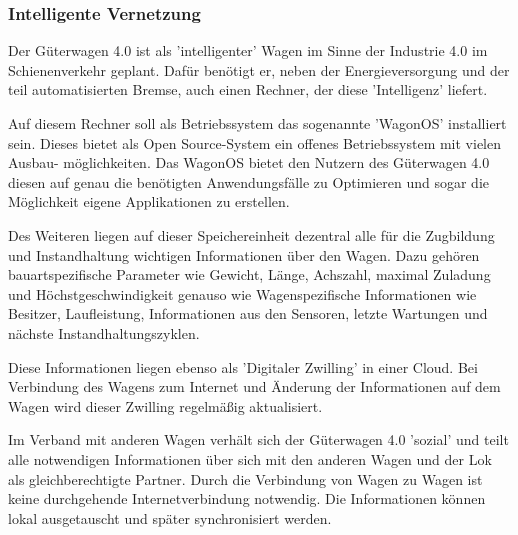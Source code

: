 \subsubsection{Intelligente Vernetzung}
Der Güterwagen 4.0 ist als 'intelligenter' Wagen im Sinne der Industrie 4.0 im Schienenverkehr geplant. Dafür benötigt er, neben der Energieversorgung und der teil automatisierten Bremse, auch einen Rechner, der diese 'Intelligenz' liefert.\par
Auf diesem Rechner soll als Betriebssystem das sogenannte 'WagonOS' installiert sein. Dieses bietet als Open Source-System ein offenes Betriebssystem mit vielen Ausbau- möglichkeiten. Das WagonOS bietet den Nutzern des Güterwagen 4.0  diesen auf genau die benötigten Anwendungsfälle zu Optimieren und sogar die Möglichkeit eigene Applikationen zu erstellen.\par
Des Weiteren liegen auf dieser Speichereinheit dezentral alle für die Zugbildung und Instandhaltung wichtigen Informationen über den Wagen. Dazu gehören bauartspezifische Parameter wie Gewicht, Länge, Achszahl, maximal Zuladung und Höchstgeschwindigkeit genauso wie Wagenspezifische Informationen wie Besitzer, Laufleistung, Informationen aus den Sensoren, letzte Wartungen und nächste Instandhaltungszyklen.\par
Diese Informationen liegen ebenso als 'Digitaler Zwilling' in einer Cloud. Bei Verbindung des Wagens zum Internet und Änderung der Informationen auf dem Wagen wird dieser Zwilling regelmäßig aktualisiert.\par
Im Verband mit anderen Wagen verhält sich der Güterwagen 4.0 'sozial' und teilt alle notwendigen Informationen über sich mit den anderen Wagen und der Lok als gleichberechtigte Partner. Durch die Verbindung von Wagen zu Wagen ist keine durchgehende Internetverbindung notwendig. Die Informationen können lokal ausgetauscht und später synchronisiert werden.

